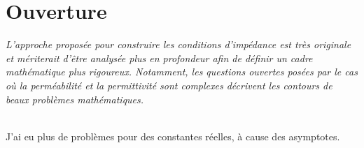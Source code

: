 \documentclass{article}
\newenvironment{REM}{\itshape}{}
\newenvironment{REP}{~{}\\}{}
\begin{document}
\section{Ouverture}
\begin{REM}
    L’approche proposée pour construire les conditions d’impédance est très originale et mériterait d’être analysée plus en profondeur afin de définir un cadre mathématique plus rigoureux.
    Notamment, les questions ouvertes posées par le cas où la perméabilité et la permittivité sont complexes décrivent les contours de beaux problèmes mathématiques.
\end{REM}

\begin{REP}
    J'ai eu plus de problèmes pour des constantes réelles, à cause des asymptotes.
\end{REP}
\end{document}

